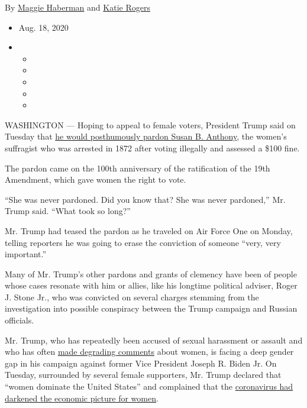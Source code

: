 By \href{https://www.nytimes3xbfgragh.onion/by/maggie-haberman}{Maggie
Haberman} and
\href{https://www.nytimes3xbfgragh.onion/by/katie-rogers}{Katie Rogers}

\begin{itemize}
\item
  Aug. 18, 2020
\item
  \begin{itemize}
  \item
  \item
  \item
  \item
  \item
  \end{itemize}
\end{itemize}

WASHINGTON --- Hoping to appeal to female voters, President Trump said
on Tuesday that
\href{https://www.nytimes3xbfgragh.onion/2020/08/18/us/politics/trump-susan-b-anthony-pardon.html}{he
would posthumously pardon Susan B. Anthony}, the women's suffragist who
was arrested in 1872 after voting illegally and assessed a \$100 fine.

The pardon came on the 100th anniversary of the ratification of the 19th
Amendment, which gave women the right to vote.

``She was never pardoned. Did you know that? She was never pardoned,''
Mr. Trump said. ``What took so long?''

Mr. Trump had teased the pardon as he traveled on Air Force One on
Monday, telling reporters he was going to erase the conviction of
someone ``very, very important.''

Many of Mr. Trump's other pardons and grants of clemency have been of
people whose cases resonate with him or allies, like his longtime
political adviser, Roger J. Stone Jr., who was convicted on several
charges stemming from the investigation into possible conspiracy between
the Trump campaign and Russian officials.

Mr. Trump, who has repeatedly been accused of sexual harassment or
assault and who has often
\href{https://www.nytimes3xbfgragh.onion/2018/10/16/us/politics/trump-women-insults.html}{made
degrading comments} about women, is facing a deep gender gap in his
campaign against former Vice President Joseph R. Biden Jr. On Tuesday,
surrounded by several female supporters, Mr. Trump declared that ``women
dominate the United States'' and complained that the
\href{https://www.nytimes3xbfgragh.onion/2020/05/09/us/unemployment-coronavirus-women.html}{coronavirus
had darkened the economic picture for women}.


